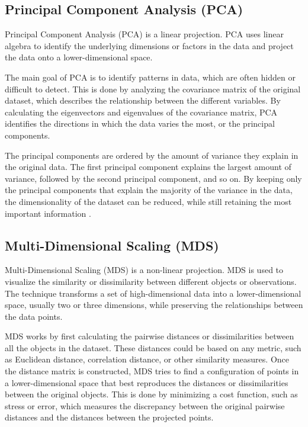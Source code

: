 \subsection{Principal Component Analysis (PCA)}

Principal Component Analysis (PCA) is a linear projection. PCA uses linear
algebra to identify the underlying dimensions or factors in the data and
project the data onto a lower-dimensional space.

The main goal of PCA is to identify patterns in data, which are often
hidden or difficult to detect. This is done by analyzing the covariance
matrix of the original dataset, which describes the relationship between
the different variables. By calculating the eigenvectors and eigenvalues
of the covariance matrix, PCA identifies the directions in which the data
varies the most, or the principal components. 

The principal components are ordered by the amount of variance they
explain in the original data. The first principal component explains the
largest amount of variance, followed by the second principal component,
and so on. By keeping only the principal components that explain the
majority of the variance in the data, the dimensionality of the dataset
can be reduced, while still retaining the most important information
\parencite{abdi2010principal}.


\subsection{Multi-Dimensional Scaling (MDS)}

Multi-Dimensional Scaling (MDS) is a non-linear projection. MDS is used to
visualize the similarity or dissimilarity between different objects or
observations. The technique transforms a set of high-dimensional data into
a lower-dimensional space, usually two or three dimensions, while
preserving the relationships between the data points.

MDS works by first calculating the pairwise distances or dissimilarities
between all the objects in the dataset. These distances could be based on
any metric, such as Euclidean distance, correlation distance, or other
similarity measures. Once the distance matrix is constructed, MDS tries to
find a configuration of points in a lower-dimensional space that best
reproduces the distances or dissimilarities between the original objects.
This is done by minimizing a cost function, such as stress or error, which
measures the discrepancy between the original pairwise distances and the
distances between the projected points.

